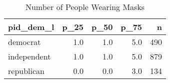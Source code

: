 \begin{table}[!htb]
\centering
\caption{Number of People Wearing Masks} 
\label{tab:parking_sum}
\begin{tabular}{lrrrr}
  \hline
pid\_dem\_l & p\_25 & p\_50 & p\_75 & n \\ 
  \hline
democrat & 1.0 & 1.0 & 5.0 & 490 \\ 
  independent & 1.0 & 1.0 & 5.0 & 879 \\ 
  republican & 0.0 & 0.0 & 3.0 & 134 \\ 
   \hline
\end{tabular}
\end{table}
